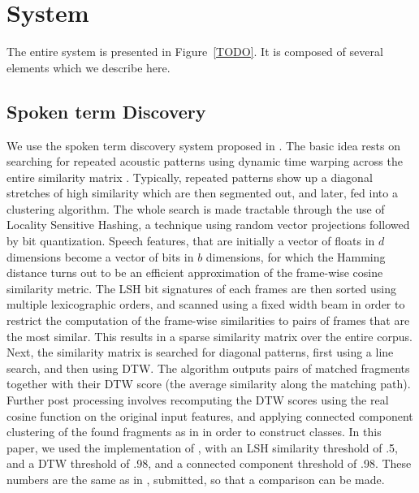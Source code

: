 \documentclass[a4paper]{article}
\begin{document}
\section{System}
The entire system is presented in Figure~\ref{TODO}. It is composed of several elements which we describe here.
\subsection{Spoken term Discovery}
We use the spoken term discovery system proposed in \cite{jansen&vandurme2011}. The basic idea rests on searching for repeated acoustic patterns using dynamic time warping across the entire similarity matrix \cite{park&glass2008}. Typically, repeated patterns show up a diagonal stretches of high similarity which are then segmented out, and later, fed into a clustering algorithm. The whole search is made tractable through the use of Locality Sensitive Hashing, a technique using random vector projections followed by bit quantization. Speech features, that are initially a vector of floats in $d$ dimensions become a vector of bits in $b$ dimensions, for which the Hamming distance turns out to be an efficient approximation of the frame-wise cosine similarity metric. The LSH bit signatures of each frames are then sorted using multiple lexicographic orders, and scanned using a fixed width beam in order to restrict the computation of the frame-wise similarities to pairs of frames that are the most similar. This results in a sparse similarity matrix over the entire corpus. Next, the similarity matrix is searched for diagonal patterns, first using a line search, and then using DTW.  The algorithm outputs pairs of matched fragments together with their DTW score (the average similarity along the matching path). Further post processing involves recomputing the DTW scores using the real cosine function on the original input features, and applying connected component clustering of the found fragments as in \cite{park&glass2008} in order to construct classes. In this paper, we used the implementation of \cite{jansen&vandurme2011}, with an LSH similarity threshold of .5, and a DTW  threshold of .98, and a connected component threshold of .98. These numbers are the same as in \cite{}, submitted, so that a comparison can be made.
\end{document}
